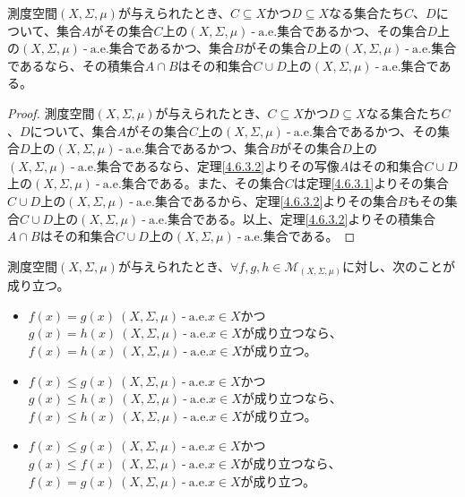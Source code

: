 \documentclass[dvipdfmx]{jsarticle}
\begin{document}
\begin{thm}\label{4.6.3.3}
測度空間$(X,\varSigma,\mu)$が与えられたとき、$C \subseteq X$かつ$D \subseteq X$なる集合たち$C$、$D$について、集合$A$がその集合$C$上の$(X,\varSigma,\mu) \ \text{-} \ \mathrm{a.e.}$集合であるかつ、その集合$D$上の$(X,\varSigma,\mu) \ \text{-} \ \mathrm{a.e.}$集合であるかつ、集合$B$がその集合$D$上の$(X,\varSigma,\mu) \ \text{-} \ \mathrm{a.e.}$集合であるなら、その積集合$A \cap B$はその和集合$C \cup D$上の$(X,\varSigma,\mu) \ \text{-} \ \mathrm{a.e.}$集合である。
\end{thm}
\begin{proof}
測度空間$(X,\varSigma,\mu)$が与えられたとき、$C \subseteq X$かつ$D \subseteq X$なる集合たち$C$、$D$について、集合$A$がその集合$C$上の$(X,\varSigma,\mu) \ \text{-} \ \mathrm{a.e.}$集合であるかつ、その集合$D$上の$(X,\varSigma,\mu) \ \text{-} \ \mathrm{a.e.}$集合であるかつ、集合$B$がその集合$D$上の$(X,\varSigma,\mu) \ \text{-} \ \mathrm{a.e.}$集合であるなら、定理\ref{4.6.3.2}よりその写像$A$はその和集合$C \cup D$上の$(X,\varSigma,\mu) \ \text{-} \ \mathrm{a.e.}$集合である。また、その集合$C$は定理\ref{4.6.3.1}よりその集合$C \cup D$上の$(X,\varSigma,\mu) \ \text{-} \ \mathrm{a.e.}$集合であるから、定理\ref{4.6.3.2}よりその集合$B$もその集合$C \cup D$上の$(X,\varSigma,\mu) \ \text{-} \ \mathrm{a.e.}$集合である。以上、定理\ref{4.6.3.2}よりその積集合$A \cap B$はその和集合$C \cup D$上の$(X,\varSigma,\mu) \ \text{-} \ \mathrm{a.e.}$集合である。
\end{proof}
\begin{thm}\label{4.6.3.4}
測度空間$(X,\varSigma,\mu)$が与えられたとき、$\forall f,g,h \in \mathcal{M}_{(X,\varSigma,\mu)}$に対し、次のことが成り立つ。
\begin{itemize}
\item
  $f(x) = g(x)\ (X,\varSigma,\mu) \ \text{-} \ \mathrm{a.e.}x \in X$かつ$g(x) = h(x)\ (X,\varSigma,\mu) \ \text{-} \ \mathrm{a.e.}x \in X$が成り立つなら、$f(x) = h(x)\ (X,\varSigma,\mu) \ \text{-} \ \mathrm{a.e.}x \in X$が成り立つ。
\item
  $f(x) \leq g(x)\ (X,\varSigma,\mu) \ \text{-} \ \mathrm{a.e.}x \in X$かつ$g(x) \leq h(x)\ (X,\varSigma,\mu) \ \text{-} \ \mathrm{a.e.}x \in X$が成り立つなら、$f(x) \leq h(x)\ (X,\varSigma,\mu) \ \text{-} \ \mathrm{a.e.}x \in X$が成り立つ。
\item
  $f(x) \leq g(x)\ (X,\varSigma,\mu) \ \text{-} \ \mathrm{a.e.}x \in X$かつ$g(x) \leq f(x)\ (X,\varSigma,\mu) \ \text{-} \ \mathrm{a.e.}x \in X$が成り立つなら、$f(x) = g(x)\ (X,\varSigma,\mu) \ \text{-} \ \mathrm{a.e.}x \in X$が成り立つ。
\end{itemize}
\end{thm}
\end{document}
